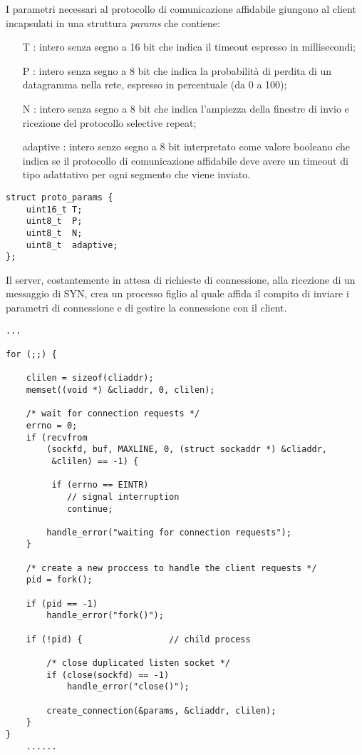 I parametri necessari al protocollo di comunicazione affidabile giungono
al client incapsulati in una struttura \emph{params} che contiene:
\begin{itemize}
\item[T]: intero senza segno a 16 bit che indica il timeout espresso in 
millisecondi;
\item[P]: intero senza segno a 8 bit che indica la probabilità di perdita di un
datagramma nella rete, espresso in percentuale (da 0 a 100);
\item[N]: intero senza segno a 8 bit che indica l'ampiezza della finestre di
invio e ricezione del protocollo selective repeat;
\item[adaptive]: intero senzo segno a 8 bit interpretato come valore booleano
che indica se il protocollo di comunicazione affidabile deve avere un timeout
di tipo adattativo per ogni segmento che viene inviato.
\end{itemize}
\begin{lstlisting}[title=basics.h]
struct proto_params {
	uint16_t T;
	uint8_t  P;
	uint8_t  N;
	uint8_t  adaptive;
};
\end{lstlisting}
Il server, costantemente in attesa di richieste di connessione, alla ricezione
di un messaggio di SYN, crea un processo figlio al quale affida il compito di 
inviare i parametri di connessione e di gestire la connessione con il client.
\begin{lstlisting}[title=server.c]
	...

for (;;) {

	clilen = sizeof(cliaddr);
	memset((void *) &cliaddr, 0, clilen);

	/* wait for connection requests */
	errno = 0;
	if (recvfrom
		(sockfd, buf, MAXLINE, 0, (struct sockaddr *) &cliaddr,
		 &clilen) == -1) {

		 if (errno == EINTR)
			// signal interruption
			continue;

		handle_error("waiting for connection requests");
	}

	/* create a new proccess to handle the client requests */
	pid = fork();

	if (pid == -1)
		handle_error("fork()");

	if (!pid) {                 // child process

		/* close duplicated listen socket */
		if (close(sockfd) == -1)
			handle_error("close()");

		create_connection(&params, &cliaddr, clilen);
	}
}
	......
\end{lstlisting}

